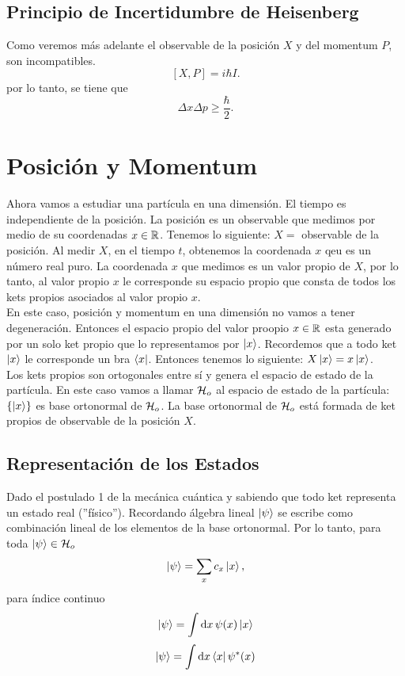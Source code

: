\section{Principio de Incertidumbre de Heisenberg}
Como veremos más adelante el observable de la posición $X$ y del momentum $P$, son incompatibles.
    $$ [X,P] = i\hbar I. $$
por lo tanto, se tiene que
    $$ \boxed{ \Delta x \Delta p  \geq \frac{\hbar}{2}. } $$


\chapter{Posición y Momentum}
Ahora vamos a estudiar una partícula en una dimensión. El tiempo es independiente de la posición. La posición es un observable que medimos por medio de su coordenadas $x\in \mathbb{R}$. Tenemos lo siguiente: $X = $ observable de la posición. Al medir $X$, en el tiempo $t$, obtenemos la coordenada $x$ qeu es un número real puro. La coordenada $x$ que medimos es un valor propio de $X$, por lo tanto, al valor propio $x$ le corresponde su espacio propio que consta de todos los kets propios asociados al valor propio $x$. \\

En este caso, posición y momentum en una dimensión no vamos a tener degeneración. Entonces el espacio propio del valor proopio $x\in \mathbb{R}$ esta generado por un solo ket propio que lo representamos por $\ket{x}$. Recordemos que a todo ket $\ket{x}$ le corresponde un bra $\bra{x}$. Entonces tenemos lo siguiente: $X\ket{x} = x\ket{x}$.\\

Los kets propios son ortogonales entre sí y genera el espacio de estado de la partícula. En este caso vamos a llamar $\mathcal{H} _o$ al espacio de estado de la partícula: $\{ \ket{x} \}$ es base ortonormal de $\mathcal{H} _o$. La base ortonormal de $\mathcal{H} _o$ está formada de ket propios de observable de la posición $X$.


\section{Representación de los Estados}
Dado el postulado 1 de la mecánica cuántica y sabiendo que todo ket representa un estado real (''físico''). Recordando álgebra lineal $\ket{\psi}$ se escribe como combinación lineal de los elementos de la base ortonormal. Por lo tanto, para toda $\ket{\psi} \in \mathcal{H} _o$
    $$ \ket{\psi} = \sum _x c_x \ket{x}, $$
para índice continuo
    $$ \ket{\psi} = \int \dd{x} \psi (x) \ket{x} $$
    $$ \ket{\psi} = \int \dd{x} \bra{x} \psi ^* (x) $$
    
